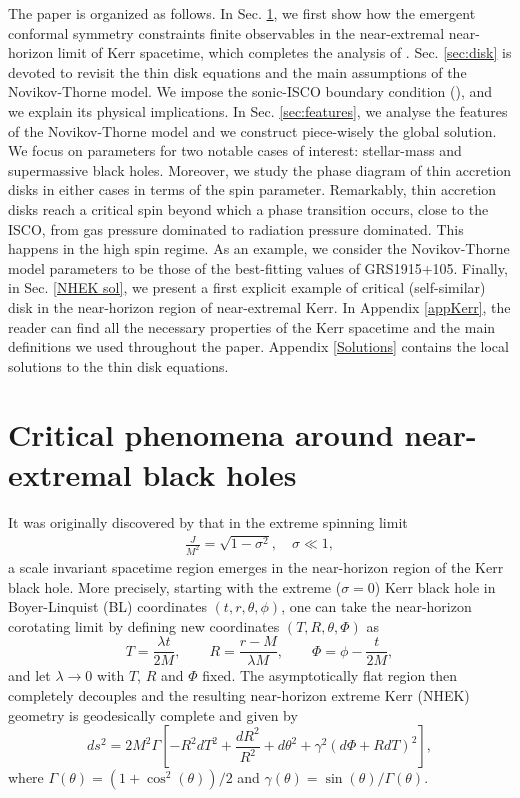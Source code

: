 \documentclass[a4paper,fleqn,usenatbib]{mnrasMOD}
\numberwithin{equation}{section}
\newcommand{\bea}{\begin{eqnarray}}
\newcommand{\eea}{\end{eqnarray}}
\newcommand{\be}{\begin{equation}}
\newcommand{\ee}{\end{equation}}
\begin{document}
The paper is organized as follows. In Sec. \ref{sec:cr}, we first show how the emergent conformal symmetry constraints finite observables in the near-extremal near-horizon limit of Kerr spacetime, which completes the analysis of \cite{Gralla:2016jfc}.
Sec. \ref{sec:disk} is devoted to revisit the thin disk equations and the main assumptions of the Novikov-Thorne model. We impose the sonic-ISCO boundary condition (\cite{Penna:2011rw}), and we explain its physical implications. In Sec. \ref{sec:features}, we analyse the features of the Novikov-Thorne model and we construct piece-wisely the global solution. We focus on parameters for two notable cases of interest: stellar-mass and supermassive black holes. Moreover, we study the phase diagram of thin accretion disks in either cases in terms of the spin parameter. Remarkably, thin accretion disks  reach a critical spin beyond which a phase transition occurs, close to the ISCO, from gas pressure dominated to radiation pressure dominated. This happens in the high spin regime. As an example, we consider the Novikov-Thorne model parameters to be those of the best-fitting values of GRS1915+105. Finally, in Sec. \ref{NHEK sol}, we present a first explicit example of critical (self-similar) disk in the near-horizon region of near-extremal Kerr. In Appendix \ref{appKerr}, the reader can find all the necessary properties of the Kerr spacetime and the main definitions we used throughout the paper. Appendix \ref{Solutions} contains the local solutions to the thin disk equations.
 


%


\section{Critical phenomena around near-extremal black holes}
\label{sec:cr}

It was originally discovered by \cite{Bardeen:1999px} that in the extreme spinning limit 
\bea
\frac{J}{M^2}=\sqrt{1-\sigma^2},\quad \sigma \ll 1,
\eea
a scale invariant spacetime region emerges in the near-horizon region of the Kerr black hole. More precisely, starting with the extreme ($\sigma = 0$) Kerr black hole in Boyer-Linquist (BL) coordinates $(t,r,\theta,\phi)$, one can take the near-horizon corotating limit by defining new coordinates 
$(T, R, \theta, \Phi)$ as
\be\label{NHEKs}
T = \frac{\lambda t}{2 M}, \qquad R = \frac{r - M}{\lambda M}, \qquad \Phi = \phi - \frac{t}{2M},
\ee
and let $\lambda \rightarrow 0$ with $T$, $R$ and $\Phi$ fixed. The asymptotically flat region then completely decouples and the resulting near-horizon extreme Kerr (NHEK) geometry is geodesically complete and given by
\be \label{NHEK}
ds^2 = 2M^2 \Gamma\left[-R^2dT^2 +\frac{dR^2}{R^2} + d\theta^2 + \gamma^{2}\left(d\Phi + RdT\right)^2\right],
\ee
where $\Gamma(\theta) = \left(1+\cos^2(\theta)\right)/2$ and $\gamma(\theta) = \sin(\theta)/\Gamma(\theta)$. 
\end{document}
